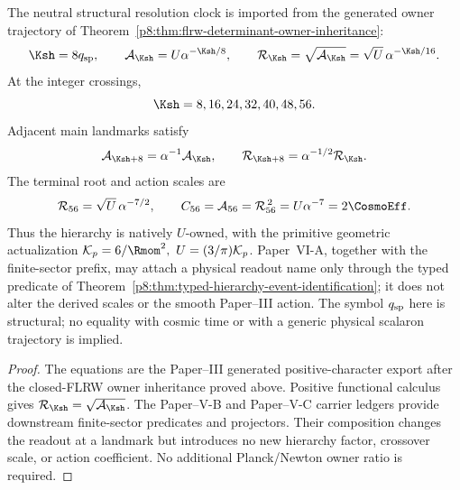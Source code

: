 \documentclass[12pt,a4paper]{article}
\begin{document}
\begin{theorem}
\label{p8:thm:protected-curvature-squared-shell-clock}
The neutral structural resolution clock is imported from the generated
owner trajectory of Theorem~\ref{p8:thm:flrw-determinant-owner-inheritance}:
\begin{equation}
\label{p8:eq:protected-action-shell-clock}
 \Ksh=8q_{\rm sp},
 \qquad
 \mathcal A_{\Ksh}=U\alpha^{-\Ksh/8},
 \qquad
 \mathcal R_{\Ksh}=\sqrt{\mathcal A_{\Ksh}}
 =\sqrt U\,\alpha^{-\Ksh/16}.
\end{equation}
At the integer crossings,
\begin{equation}
\label{p8:eq:protected-cosmological-K-ladder}
 \Ksh=8,16,24,32,40,48,56.
\end{equation}
Adjacent main landmarks satisfy
\begin{equation}
\label{p8:eq:action-shell-one-step}
 \mathcal A_{\Ksh+8}=\alpha^{-1}\mathcal A_{\Ksh},
 \qquad
 \mathcal R_{\Ksh+8}=\alpha^{-1/2}\mathcal R_{\Ksh}.
\end{equation}
The terminal root and action scales are
\begin{equation}
\label{p8:eq:terminal-action-shell-readout}
 \mathcal R_{56}=\sqrt U\,\alpha^{-7/2},
 \qquad
 C_{56}=\mathcal A_{56}=\mathcal R_{56}^{\,2}
 =U\alpha^{-7}=2\CosmoEff.
\end{equation}
Thus the hierarchy is natively \(U\)-owned, with the primitive geometric actualization \(\mathcal K_p=6/\Rmom^2,\ U=(3/\pi)\mathcal K_p\).
Paper~VI-A, together with the finite-sector prefix, may attach a physical
readout name only through the typed predicate of
Theorem~\ref{p8:thm:typed-hierarchy-event-identification}; it does not alter
the derived scales or the smooth Paper--III action.  The symbol \(q_{\rm sp}\)
here is structural; no equality with cosmic time or with a generic physical
scalaron trajectory is implied.
\end{theorem}

\begin{proof}
The equations are the Paper--III generated positive-character export after
the closed-FLRW owner inheritance proved above.  Positive functional calculus
gives \(\mathcal R_{\Ksh}=\sqrt{\mathcal A_{\Ksh}}\).  The Paper--V-B and
Paper--V-C carrier ledgers provide downstream finite-sector predicates and
projectors.  Their composition changes the readout at a landmark but
introduces no new hierarchy factor, crossover scale, or action coefficient.
No additional Planck/Newton owner ratio is required.
\end{proof}
\end{document}
